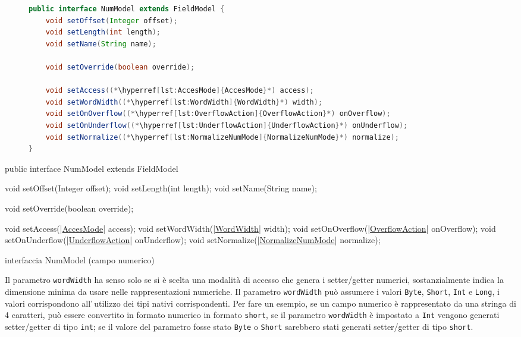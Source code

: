 \ifesource
\begin{figure*}[!htb]
\begin{lstlisting}[language=java, 
caption=interfaccia NumModel (campo numerico), 
label=lst:NumModel]
public interface NumModel extends FieldModel {
    void setOffset(Integer offset);
    void setLength(int length);
    void setName(String name);

    void setOverride(boolean override);

    void setAccess((*\hyperref[lst:AccesMode]{AccesMode}*) access);
    void setWordWidth((*\hyperref[lst:WordWidth]{WordWidth}*) width);
    void setOnOverflow((*\hyperref[lst:OverflowAction]{OverflowAction}*) onOverflow);
    void setOnUnderflow((*\hyperref[lst:UnderflowAction]{UnderflowAction}*) onUnderflow);
    void setNormalize((*\hyperref[lst:NormalizeNumMode]{NormalizeNumMode}*) normalize);
}
\end{lstlisting}
\end{figure*}
\else
\begin{elisting}[!htb]
\begin{javacode}
public interface NumModel extends FieldModel {
    void setOffset(Integer offset);
    void setLength(int length);
    void setName(String name);

    void setOverride(boolean override);

    void setAccess(|\hyperref[lst:AccesMode]{AccesMode}| access);
    void setWordWidth(|\hyperref[lst:WordWidth]{WordWidth}| width);
    void setOnOverflow(|\hyperref[lst:OverflowAction]{OverflowAction}| onOverflow);
    void setOnUnderflow(|\hyperref[lst:UnderflowAction]{UnderflowAction}| onUnderflow);
    void setNormalize(|\hyperref[lst:NormalizeNumMode]{NormalizeNumMode}| normalize);
}
\end{javacode}
\caption{interfaccia NumModel (campo numerico)}
\label{lst:NumModel}
\end{elisting}
\fi

Il parametro \verb!wordWidth! ha senso solo se si è scelta una modalità di
accesso che genera i setter/getter numerici, sostanzialmente indica la 
dimensione minima da usare nelle rappresentazioni numeriche.
Il parametro \verb!wordWidth! può assumere i valori \verb!Byte!, \verb!Short!, 
\verb!Int! e \verb!Long!, i valori corrispondono all'\,utilizzo dei tipi nativi
corrispondenti.
Per fare un esempio, se un campo numerico è rappresentato da una stringa di 4 
caratteri, può essere convertito in formato numerico in formato \verb!short!,
se il parametro \verb!wordWidth! è impostato a \verb!Int! vengono generati
setter/getter di tipo \verb!int!; se il valore del parametro fosse stato 
\verb!Byte! o  \verb!Short! sarebbero stati generati setter/getter di tipo 
\verb!short!.

